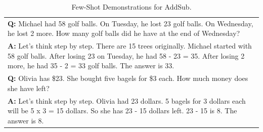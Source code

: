 \documentclass[11pt]{article}
\begin{document}
\begin{table}[ht]
\begin{tabularx}{\textwidth}{X}
    \hdashline
    \textbf{Q: }Michael had 58 golf balls. On Tuesday, he lost 23 golf balls. On Wednesday, he lost 2 more. How many golf balls did he have at the end of Wednesday? \\
    \textbf{A: }Let's think step by step. There are 15 trees originally. Michael started with 58 golf balls. After losing 23 on Tuesday, he had 58 - 23 = 35. After losing 2 more, he had 35 - 2 = 33 golf balls. The answer is 33.\\
    \hdashline
    \textbf{Q: }Olivia has \$23. She bought five bagels for \$3 each. How much money does she have left? \\
    \textbf{A: }Let's think step by step. Olivia had 23 dollars. 5 bagels for 3 dollars each will be 5 x 3 = 15 dollars. So she has 23 - 15 dollars left. 23 - 15 is 8. The answer is 8.\\
    \bottomrule
    \end{tabularx}
    \caption{Few-Shot Demonstrations for AddSub.}
    \label{tab:fs_addsub}
\end{table}
\end{document}
